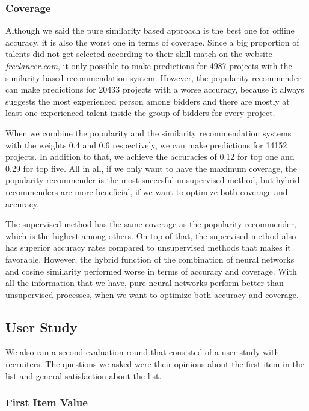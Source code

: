 \subsubsection{Coverage}

Although we said the pure similarity based approach is the best one for offline accuracy, it is also the worst one in terms of coverage. Since a big proportion of talents did not get selected according to their skill match on the website \textit{freelancer.com}, it only possible to make predictions for 4987 projects with the similarity-based recommendation system. However, the popularity recommender can make predictions for 20433 projects with a worse accuracy, because it always suggests the most experienced person among bidders and there are mostly at least one experienced talent inside the group of bidders for every project.

When we combine the popularity and the similarity recommendation systems with the weights 0.4 and 0.6 respectively, we can make predictions for 14152 projects. In addition to that,  we achieve the accuracies of 0.12 for top one and 0.29 for top five. All in all, if we only want to have the maximum coverage, the popularity recommender is the most succesful unsupervised method, but hybrid recommenders are more beneficial, if we want to optimize both coverage and accuracy.

The supervised method has the same coverage as the popularity recommender, which is the highest among others. On top of that, the supervised method also has superior accuracy rates compared to unsupervised methods that makes it favorable. However, the hybrid function of the combination of neural networks and cosine similarity performed worse in terms of accuracy and coverage. With all the information that we have, pure neural networks perform better than unsupervised processes, when we want to optimize both accuracy and coverage.

\subsection{User Study}

We also ran a second evaluation round that consisted of a user study with recruiters. The questions we asked were their opinions about the first item in the list and general satisfaction about the list.

\subsubsection{First Item Value}

